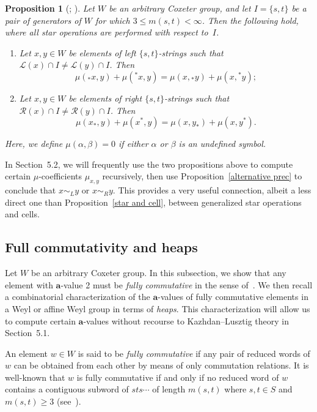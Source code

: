 \documentclass[10pt]{article}
\newtheorem{prop}[theorem]{Proposition}
\theoremstyle{definition}
\newcommand{\la}{\mathbf{a}}
\begin{document}
 \begin{prop}[{\cite[Section 10.4]{Mu}}; {\cite[Proposition~5.9]{Green_Jones}}]
 \label{star relation}
 Let $W$ be an arbitrary Coxeter group, and let $I=\{s,t\}$ be a pair of
 generators of $W$ for which $3\le m(s,t)<\infty$. Then the following
 hold,
 where all star operations are performed with respect to~$I$.

 \begin{enumerate}
 \item\label{prop3.7_1} 
 Let $x,y\in W$ be
 elements of left $\{s,t\}$-strings such that $\mathcal{L}(x)\cap I\neq
 \mathcal{L}(y)\cap I$. Then
 \[
 \mu({}_* x,y)+\mu({}^* x,y)=\mu(x,{}_* y)+\mu(x, {}^* y);
 \]

 \item\label{prop3.7_2} 
 Let $x,y\in W$ be
 elements of right $\{s,t\}$-strings such that $\mathcal{R}(x)\cap I\neq
 \mathcal{R}(y)\cap I$. Then
 \[
 \mu(x_*,y)+\mu(x^*,y)=\mu(x,y_*)+\mu(x, y^*).
 \]
 \end{enumerate}
 Here, we define $\mu(\alpha,\beta)=0$ if either $\alpha$ or $\beta$ is an undefined symbol.
 \end{prop}


 In Section~5.2, we will frequently use the two propositions above to
 compute certain $\mu$-coefficients $\mu_{x,y}$ recursively, then use Proposition~\ref{alternative prec} to conclude that $x\sim_{L}y$ or $x\sim_R y$. This provides
 a very useful connection, albeit a less direct one than Proposition~\ref{star
 and cell}, between generalized star operations and cells. 

 \subsection{Full commutativity and heaps} 
 \label{fc}
 Let $W$ be an arbitrary Coxeter group. In this subsection,
 we show that any element with $\la$-value 2 must be
 \emph{fully commutative} in the sense of~\cite{FC}. We then recall a
 combinatorial characterization of the $\la$-values of fully commutative
 elements in a Weyl or affine Weyl group in terms of \emph{heaps}. This
 characterization will allow us to compute certain $\la$-values without
 recourse to Kazhdan--Lusztig theory in Section~5.1.

 An element $w\in W$ is said to be \emph{fully commutative} if any pair of
 reduced words of $w$ can be obtained from each other by means of only
 commutation relations. It is well-known that $w$ is fully commutative if
 and only if no reduced word of $w$ contains a
 contiguous subword of $sts\cdots$ of length $m(s,t)$ where $s,t\in S$
 and $m(s,t)\ge 3$ (see~\cite[Proposition~2.1]{FC}).
\end{document}
